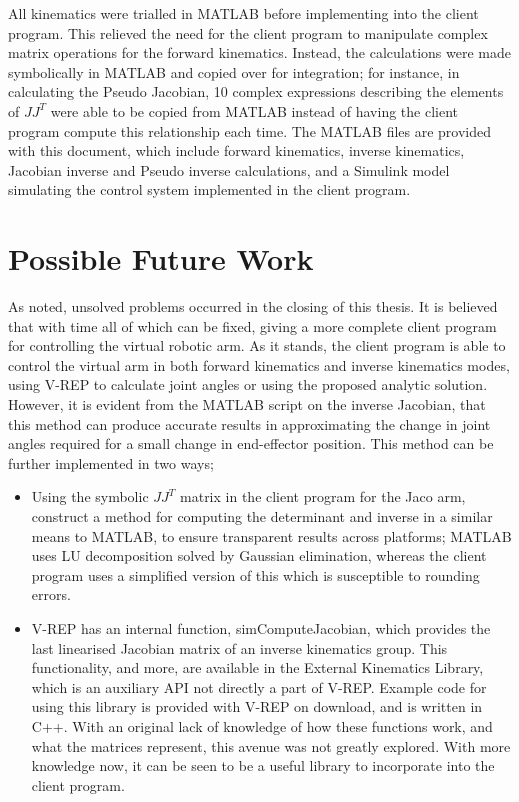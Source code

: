 \documentclass[12pt,openany,a4paper]{book}
\begin{document}
All kinematics were trialled in MATLAB before implementing into the client program. This relieved the need for the client program to manipulate complex matrix operations for the forward kinematics. Instead, the calculations were made symbolically in MATLAB and copied over for integration; for instance, in calculating the Pseudo Jacobian, 10 complex expressions describing the elements of $JJ^T$ were able to be copied from MATLAB instead of having the client program compute this relationship each time. The MATLAB files are provided with this document, which include forward kinematics, inverse kinematics, Jacobian inverse and Pseudo inverse calculations, and a Simulink model simulating the control system implemented in the client program.


\section{Possible Future Work}
As noted, unsolved problems occurred in the closing of this thesis. It is believed that with time all of which can be fixed, giving a more complete client program for controlling the virtual robotic arm. As it stands, the client program is able to control the virtual arm in both forward kinematics and inverse kinematics modes, using V-REP to calculate joint angles or using the proposed analytic solution. However, it is evident from the MATLAB script on the inverse Jacobian, that this method can produce accurate results in approximating the change in joint angles required for a small change in end-effector position. This method can be further implemented in two ways;

\begin{itemize}

	\item Using the symbolic $JJ^T$ matrix in the client program for the Jaco arm, construct a method for computing the determinant and inverse in a similar means to MATLAB, to ensure transparent results across platforms; MATLAB uses LU decomposition solved by Gaussian elimination, whereas the client program uses a simplified version of this which is susceptible to rounding errors.
	\item V-REP has an internal function, simComputeJacobian, which provides the last linearised Jacobian matrix of an inverse kinematics group. This functionality, and more, are available in the External Kinematics Library, which is an auxiliary API not directly a part of V-REP. Example code for using this library is provided with V-REP on download, and is written in C++. With an original lack of knowledge of how these functions work, and what the matrices represent, this avenue was not greatly explored. With more knowledge now, it can be seen to be a useful library to incorporate into the client program.

\end{itemize}
\end{document}
